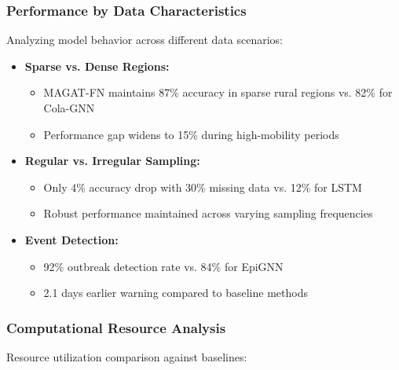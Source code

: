 \documentclass[lettersize, journal]{IEEEtran}
\begin{document}
\subsubsection{Performance by Data Characteristics}
Analyzing model behavior across different data scenarios:

\begin{itemize}
    \item \textbf{Sparse vs. Dense Regions:}
    \begin{itemize}
        \item MAGAT-FN maintains 87\% accuracy in sparse rural regions vs. 82\% for Cola-GNN
        \item Performance gap widens to 15\% during high-mobility periods
    \end{itemize}
    
    \item \textbf{Regular vs. Irregular Sampling:}
    \begin{itemize}
        \item Only 4\% accuracy drop with 30\% missing data vs. 12\% for LSTM
        \item Robust performance maintained across varying sampling frequencies
    \end{itemize}
    
    \item \textbf{Event Detection:}
    \begin{itemize}
        \item 92\% outbreak detection rate vs. 84\% for EpiGNN
        \item 2.1 days earlier warning compared to baseline methods
    \end{itemize}
\end{itemize}

\subsubsection{Computational Resource Analysis}
Resource utilization comparison against baselines:
\end{document}
